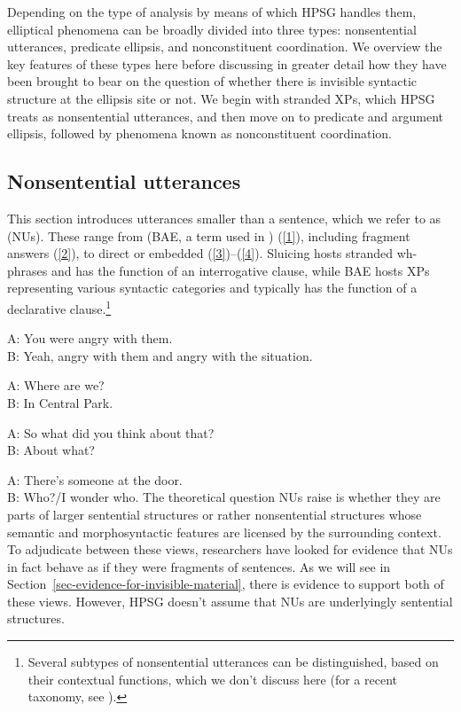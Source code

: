 \documentclass[output=paper
                ,modfonts
                ,nonflat
	        ,collection
	        ,collectionchapter
	        ,collectiontoclongg
 	        ,biblatex
                ,babelshorthands
                ,newtxmath
                ,draftmode
                ,colorlinks, citecolor=brown
]{./langsci/langscibook}
\begin{document}
{Depending on the type of analysis by means of which HPSG handles them, elliptical phenomena can be broadly divided into three types:
         nonsentential utterances, predicate ellipsis, and nonconstituent coordination.
          We overview the key features of these types here before discussing in greater detail how they have been brought to bear on the question of whether there is invisible syntactic structure at the ellipsis site or not. We begin with stranded XPs, which HPSG treats as nonsentential utterances, and then move on to predicate and argument ellipsis, followed by phenomena known as nonconstituent coordination.


\subsection{Nonsentential utterances}
This section introduces utterances smaller than a sentence, which we refer to as \emph{} (NUs). These range from \emph{} (BAE, a term used in \citealt{CJ2005a}) (\ref{1}), including fragment answers (\ref{2}), to direct or embedded  (\ref{3})--(\ref{4}). Sluicing hosts stranded wh-phrases and has the function of an interrogative clause, while BAE hosts XPs representing various syntactic categories and typically has the function of a declarative clause.\footnote{Several subtypes of nonsentential utterances can be distinguished, based on their contextual functions, which we don't discuss here (for a recent taxonomy, see \citealt[217]{Ginzburg2012}).}



\ea A: You were angry with them.\\ B: Yeah, angry with them and angry with the situation.\label{1}\z

\ea A: Where are we? \\B: In Central Park.\label{2}\z

\ea A: So what did you think about that?\\ B: About what? \label{3}\z

\ea A: There's someone at the door. \\B: Who?/I wonder who. \label{4}\z
The theoretical question NUs raise is whether they are parts of larger sentential structures or rather nonsentential structures whose semantic and morphosyntactic features are licensed by the surrounding context. To adjudicate between these views, researchers have looked for evidence that NUs in fact behave as if they were fragments of sentences. As we will see in Section~\ref{sec-evidence-for-invisible-material}, there is evidence to support both of these views. However, HPSG doesn't assume that NUs are underlyingly sentential structures.

}
\end{document}
